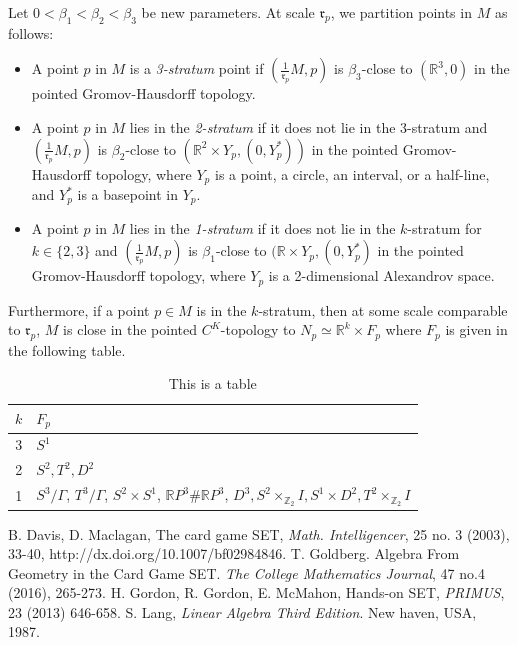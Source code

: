 \documentclass[ma491]{swumath}
\begin{document}
Let $0 < \beta_1 < \beta_2 < \beta_3$ be new parameters. 
At scale $\mathfrak{r}_p$, we partition points in $M$ as follows:
\begin{itemize}
\item A point $p$ in $M$ is a \emph{3-stratum} point if $(\frac{1}{\mathfrak{r}_p} M, p)$ is $\beta_3$-close to $(\mathbb{R}^3, 0)$ in the pointed Gromov-Hausdorff topology.
\item A point $p$ in $M$ lies in the \emph{2-stratum} if it does not lie in the 3-stratum and $(\frac{1}{\mathfrak{r}_p} M, p)$ is $\beta_2$-close to $(\mathbb{R}^2 \times Y_p, (0, Y^*_p))$ in the pointed Gromov-Hausdorff topology, where
$Y_p$ is a point, a circle, an interval, or a half-line, and $Y^*_p$ is a basepoint in $Y_p$.
\item A point $p$ in $M$ lies in the \emph{1-stratum} if it does not lie in the $k$-stratum for $k \in \{2,3\}$ and 
$(\frac{1}{\mathfrak{r}_p} M, p)$ is $\beta_1$-close to $(\mathbb{R} \times Y_p, (0, Y^*_p)$ in the pointed Gromov-Hausdorff topology, where
$Y_p$ is a 2-dimensional Alexandrov space.
\end{itemize}

Furthermore, if a point $p \in M$ is in the $k$-stratum, then 
at some scale comparable to $\mathfrak{r}_p$, $M$ is 
close in the pointed $C^K$-topology to $N_p \simeq \mathbb{R}^k \times F_p$ where $F_p$ is given in the following table.

\begin{table}[h]
\centering
\begin{tabular}{|c|l|} 
\hline
$k$ & $F_p$ \\ \hline
3 & $S^1$ \\ \hline
2 & $S^2, T^2, D^2$ \\ \hline
1 & $S^3/\Gamma$, $T^3/\Gamma$, $S^2 \times S^1$, $\mathbb{R}P^3 \# \mathbb{R}P^3$,
$D^3, S^2 \times_{\mathbb{Z}_2} I, S^1 \times D^2, T^2 \times_{\mathbb{Z}_2} I$ \\ \hline
\end{tabular}
\caption{This is a table}
\end{table}

\begin{thebibliography}{20}
 B. Davis, D. Maclagan, The card game SET, \emph{Math. Intelligencer}, 25 no. 3 (2003), 33-40, http://dx.doi.org/10.1007/bf02984846.
 T. Goldberg. Algebra From Geometry in the Card Game SET. \emph{The College Mathematics Journal}, 47 no.4 (2016), 265-273.
 H. Gordon, R. Gordon, E. McMahon, Hands-on SET, \emph{PRIMUS}, 23 (2013) 646-658.  
 S. Lang, \emph{Linear Algebra Third Edition}. New haven, USA, 1987.
\end{thebibliography}
\end{document}
